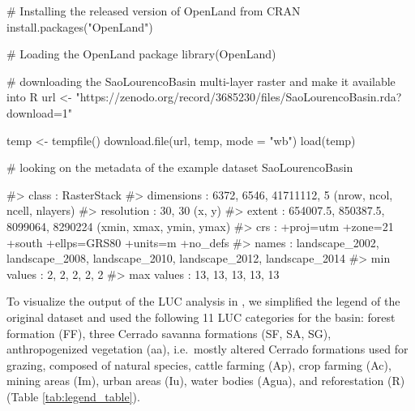 \begin{Schunk}
\begin{Sinput}
# Installing the released version of OpenLand from CRAN
install.packages("OpenLand")

# Loading the OpenLand package
library(OpenLand)

# downloading the SaoLourencoBasin multi-layer raster and make it available into R
url <- "https://zenodo.org/record/3685230/files/SaoLourencoBasin.rda?download=1"

temp <- tempfile()
download.file(url, temp, mode = "wb")
load(temp)

# looking on the metadata of the example dataset
SaoLourencoBasin 
\end{Sinput}
\begin{Soutput}
#> class      : RasterStack 
#> dimensions : 6372, 6546, 41711112, 5  (nrow, ncol, ncell, nlayers)
#> resolution : 30, 30  (x, y)
#> extent     : 654007.5, 850387.5, 8099064, 8290224  (xmin, xmax, ymin, ymax)
#> crs        : +proj=utm +zone=21 +south +ellps=GRS80 +units=m +no_defs 
#> names      : landscape_2002, landscape_2008, landscape_2010, landscape_2012, landscape_2014 
#> min values :              2,              2,              2,              2,              2 
#> max values :             13,             13,             13,             13,             13
\end{Soutput}
\end{Schunk}

To visualize the output of the LUC analysis in , we simplified
the legend of the original dataset and used the following 11 LUC
categories for the basin: forest formation (FF), three Cerrado savanna
formations (SF, SA, SG), anthropogenized vegetation (aa), i.e.~mostly
altered Cerrado formations used for grazing, composed of natural
species, cattle farming (Ap), crop farming (Ac), mining areas (Im),
urban areas (Iu), water bodies (Agua), and reforestation (R) (Table
\ref{tab:legend_table}).

